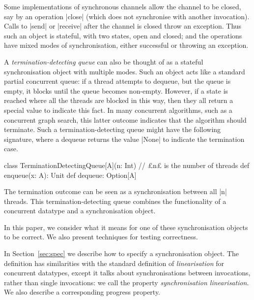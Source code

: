 Some implementations of synchronous channels allow the channel to be closed,
say by an operation |close| (which does not synchronise with another
invocation).  Calls to |send| or |receive| after the channel is closed throw
an exception.  Thus such an object is stateful, with two states, open and
closed; and the operations have mixed modes of synchronisation, either
successful or throwing an exception.

A \emph{termination-detecting queue} can also be thought of as a stateful
synchronisation object with multiple modes.  Such an object acts like a
standard partial concurrent queue: if a thread attempts to dequeue, but the
queue is empty, it blocks until the queue becomes non-empty.  However, if a
state is reached where all the threads are blocked in this way, then they all
return a special value to indicate this fact.  In many concurrent algorithms,
such as a concurrent graph search, this latter outcome indicates that the
algorithm should terminate.  Such a termination-detecting queue might have the
following signature, where a dequeue returns the value |None| to indicate the
termination case.
%
\begin{scala}
class TerminationDetectingQueue[A](n: Int){ // £n£ is the number of threads   
  def enqueue(x: A): Unit
  def dequeue: Option[A]
}
\end{scala} 
%
The termination outcome can be seen as a synchronisation between all |n|
threads.  This termination-detecting queue combines the functionality of a
concurrent datatype and a synchronisation object.



In this paper, we consider what it means for one of these synchronisation
objects to be correct.  We also present techniques for testing correctness.  

In Section~\ref{sec:spec} we describe how to specify a synchronisation
object.  The definition has similarities with the standard definition of
\emph{linearisation} for concurrent datatypes, except it talks about
synchronisations between invocations, rather than single invocations: we call
the property \emph{synchronisation linearisation}.  We also describe a
corresponding progress property.

